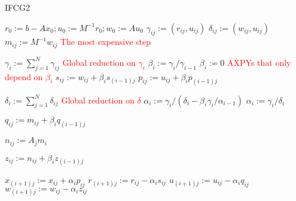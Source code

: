 \begin{algorithm}[htpb]
\caption{IFCG2}
\label{alg:ifcg2}
{\fontsize{9}{9}\selectfont
\begin{algorithmic}[1]
        \State $r_{0} := b - Ax_{0}; u_{0} := M^{-1}r_{0}; w_{0} := Au_{0}$
                        \State $\gamma_{ij} := (r_{ij}, u_{ij})$
                        \State $\delta_{ij} := (w_{ij}, u_{ij})$
                        \State $m_{ij} := M^{-1}w_{ij}$
                        \Comment \textcolor{red}{The most expensive step}
                \EndFor

                \State $\gamma_{i} := \sum\limits_{j=1}^N \gamma_{ij}$
                \Comment \textcolor{red}{Global reduction on $\gamma_{i}$}
                        \State $\beta_{i} := \gamma_{i}/\gamma_{i-1}$
                \Else
                        \State $\beta_{i} := 0$
                \EndIf
                        \Comment \textcolor{red}{AXPYs that only depend on $\beta_{i}$}
                        \State $s_{ij} := w_{ij} + \beta_{i}s_{(i-1)j}$
                        \State $p_{ij} := u_{ij} + \beta_{i}p_{(i-1)j}$

                \EndFor

                \State $\delta_i := \sum\limits_{j=1}^N \delta_{ij}$
                \Comment \textcolor{red}{Global reduction on $\delta$}
                        \State $\alpha_{i} := \gamma_{i}/(\delta_i - \beta_{i}\gamma_{i}/\alpha_{i-1})$
                \Else
                        \State $\alpha_{i} := \gamma_{i}/\delta_i$
                \EndIf

                        \State $q_{ij} := m_{ij} + \beta_{i}q_{(i-1)j}$

                        \State $n_{ij} := A_{j}m_{i}$

                        \State $z_{ij} := n_{ij} + \beta_{i}z_{(i-1)j}$

                        \State $x_{(i+1)j} := x_{ij} + \alpha_{i}p_{ij}$
                        \State $r_{(i+1)j} := r_{ij} - \alpha_{i}s_{ij}$
                        \State $u_{(i+1)j} := u_{ij} - \alpha_{i}q_{ij}$
                        \State $w_{(i+1)j} := w_{ij} - \alpha_{i}z_{ij}$
                \EndFor
        \EndFor
\end{algorithmic}
}
\end{algorithm}

